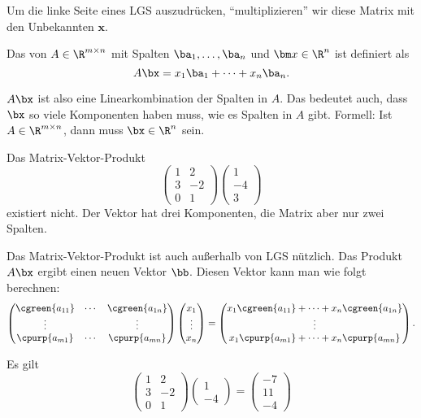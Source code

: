 Um die linke Seite eines LGS auszudrücken, ``multiplizieren'' wir diese Matrix mit den Unbekannten $\bm x$.

\begin{definition} \label{def:2:Matrix-Vektor-Produkt}
	Das  von $A \in \R^{m \times n}$ mit Spalten $\ba_1, \dots, \ba_n$ und $\bm x \in \R^n$ ist definiert als
	$$A \bx = x_1 \ba_1 + \cdots + x_n \ba_n.$$
\end{definition}


$A\bx$ ist also  eine Linearkombination der Spalten in $A$. Das bedeutet auch, dass $\bx$ so viele Komponenten haben muss, wie es Spalten in $A$ gibt. Formell: Ist $A \in \R^{m\times n}$, dann muss $\bx \in \R^n$ sein.
\begin{example}
	Das Matrix-Vektor-Produkt
	$$ \begin{pmatrix}
			1 & 2  \\
			3 & -2 \\
			0 & 1
		\end{pmatrix} \begin{pmatrix}
			1 \\ -4 \\ 3
		\end{pmatrix}  $$
	existiert nicht. Der Vektor hat drei Komponenten, die Matrix aber nur zwei Spalten.
\end{example}

Das Matrix-Vektor-Produkt ist auch außerhalb von LGS nützlich. Das Produkt $A\bx$ ergibt einen neuen Vektor $\bb$. Diesen Vektor kann man wie folgt berechnen:
$$\begin{pmatrix}
		\cgreen{a_{11}} & \cdots & \cgreen{a_{1n}} \\
		\vdots          &        & \vdots          \\
		\cpurp{a_{m1}}  & \cdots & \cpurp{a_{mn}}  \\
	\end{pmatrix} \begin{pmatrix}
		x_1 \\ \vdots \\ x_n
	\end{pmatrix} =  \begin{pmatrix}
		x_1 \cgreen{a_{11}} + \cdots + x_n \cgreen{a_{1n}} \\
		\vdots                                             \\
		x_1 \cpurp{a_{m1}} + \cdots + x_n \cpurp{a_{mn}}
	\end{pmatrix}.$$

\begin{example}
	Es gilt
	$$ \begin{pmatrix}
			1 & 2  \\
			3 & -2 \\
			0 & 1
		\end{pmatrix} \begin{pmatrix}
			1 \\ -4
		\end{pmatrix} = \begin{pmatrix}
			-7 \\ 11 \\ -4
		\end{pmatrix} $$
\end{example}


